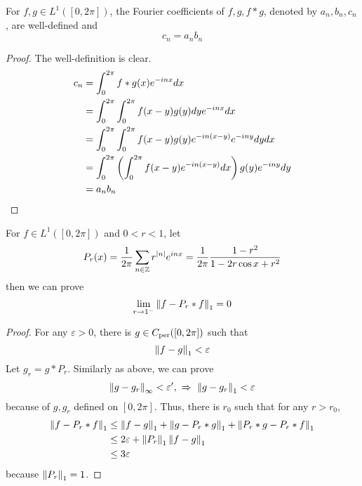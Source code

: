 \begin{enumerate}[label=\arabic*.]
	\begin{prop}
		For $f, g \in L^1([0,2\pi])$, the Fourier coefficients of $f,g,f*g$, denoted by $a_n,b_n,c_n$, are well-defined and
		\begin{equation*}
			c_n = a_nb_n
		\end{equation*}
	\end{prop}
	\begin{proof}
		The well-definition is clear.
		\begin{equation*}
			\begin{aligned}
				c_n &= \int_0^{2\pi}f * g(x) e^{-inx}dx \\
				&= \int_0^{2\pi} \int_0^{2\pi} f(x-y) g(y)dy e^{-inx}dx \\
				&= \int_0^{2\pi} \int_0^{2\pi} f(x-y) g(y)e^{-in(x-y)} e^{-iny}dydx \\
				&= \int_0^{2\pi} \left(\int_0^{2\pi} f(x-y) e^{-in(x-y)} dx\right)g(y)e^{-iny}dy \\
				&= a_nb_n
			\end{aligned}
		\end{equation*}
	\end{proof}

	\begin{prop}
		For $f \in L^1([0,2\pi])$ and $0 < r < 1$, let
		\begin{equation*}
			P_r(x) = \frac{1}{2\pi}\sum_{n \in \mathbb{Z}} r^{\left\lvert n\right\lvert}e^{inx} = \frac{1}{2\pi} \frac{1-r^2}{1-2r\cos x +r^2}
		\end{equation*}
		then we can prove
		\begin{equation*}
			\lim_{r \rightarrow 1^-}\left\lVert f - P_r*f\right\lVert_1 = 0
		\end{equation*}
	\end{prop}
	\begin{proof}
		For any $\varepsilon >0$, there is $g \in C_{\operatorname{per}}([0,2\pi])$ such that
		\begin{equation*}
			\left\lVert f - g\right\lVert_1 < \varepsilon
		\end{equation*}
		Let $g_r = g * P_r$. Similarly as above, we can prove
		\begin{equation*}
			\left\lVert g - g_r\right\lVert_\infty < \varepsilon^\prime,~\Rightarrow~ \left\lVert g - g_r\right\lVert_1 < \varepsilon
		\end{equation*}
		because of $g,g_r$ defined on $[0,2\pi]$. Thus, there is $r_0$ such that for any $r > r_0$,
		\begin{equation*}
			\begin{aligned}
				\left\lVert f - P_r*f\right\lVert_1 &\leq \left\lVert f - g\right\lVert_1 + \left\lVert g - P_r * g\right\lVert_1 + \left\lVert P_r * g-P_r *f\right\lVert_1\\
				&\leq 2\varepsilon + \left\lVert P_r\right\lVert_1\left\lVert f - g\right\lVert_1\\
				&\leq 3\varepsilon
			\end{aligned}
		\end{equation*}
		because $\left\lVert P_r\right\lVert_1 = 1$.
	\end{proof}
	

\end{enumerate}
